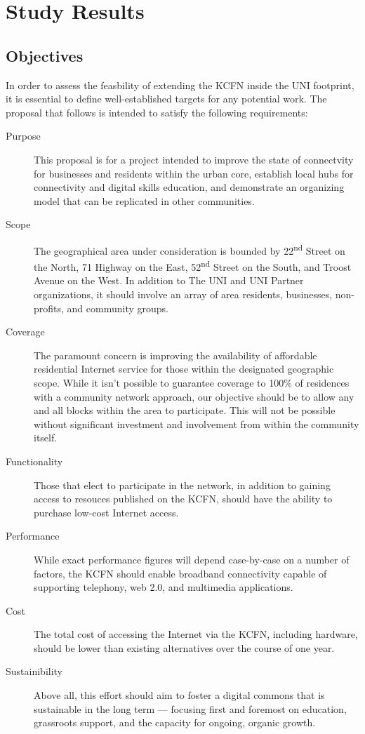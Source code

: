 \section{Study Results}
\subsection{Objectives}
In order to assess the feasbility of extending the KCFN inside the UNI footprint,
it is essential to define well-established targets for any potential work. The
proposal that follows is intended to satisfy the following requirements:
\begin{description}
\item[Purpose] This proposal is for a project intended to improve the state of
connectvity for businesses and residents within the urban core, establish
local hubs for connectivity and digital skills
education, and demonstrate an organizing model that can be replicated in other
 communities.
\item[Scope] The geographical area under consideration is bounded by 22\textsuperscript{nd}
Street on the North, 71 Highway on the East, 52\textsuperscript{nd} Street on the South, and
Troost Avenue on the West. In addition to The UNI and UNI Partner organizations, it 
should involve an array of area residents, businesses, non-profits, and community groups.
\item[Coverage] The paramount concern is improving the availability of 
affordable residential Internet service for those within the designated geographic
scope. While it isn't possible to guarantee coverage to 100\% of residences with a community network approach,
our objective should be to allow any and all blocks within the area to participate. This
will not be possible without significant investment and involvement from within the
community itself.
\item[Functionality] Those that elect to participate in the network, in addition
to gaining access to resouces published on the KCFN, should have the
ability to purchase low-cost Internet access. 
\item[Performance] While exact performance figures will depend case-by-case on a
number of factors, the KCFN should enable broadband connectivity capable of supporting
telephony, web 2.0, and multimedia applications.
\item[Cost] The total cost of
accessing the Internet via the KCFN, including hardware, should be lower than existing
alternatives over the course of one year.
\item[Sustainibility] Above all, this effort should aim to foster a digital commons
that is sustainable in the long term --- focusing first and foremost on education, grassroots
support, and the capacity for ongoing, organic growth.
\end{description}
